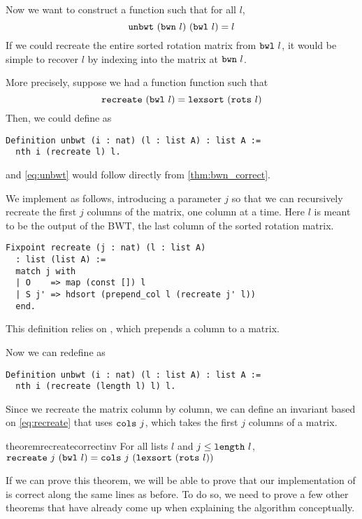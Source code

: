 \documentclass[sigplan,10pt,anonymous,review]{thesis}
\begin{document}
Now we want to construct a function  such that for all $l$,
\begin{equation}
  \texttt{\textup{unbwt}}~(\texttt{\textup{bwn}}~l)~(\texttt{\textup{bwl}}~l) = l
  \label{eq:unbwt}
\end{equation}
If we could recreate the entire sorted rotation matrix from
$\texttt{\textup{bwl}}~l$, it would be simple to recover $l$ by indexing into
the matrix at $\texttt{\textup{bwn}}~l$.

More precisely, suppose we had a function function 
such that
\begin{equation}
  \label{eq:recreate}
  \texttt{\textup{recreate}}~(\texttt{\textup{bwl}}~l) = \texttt{\textup{lexsort}}~(\texttt{\textup{rots}}~l)
\end{equation}
Then, we could define  as
\begin{lstlisting}
Definition unbwt (i : nat) (l : list A) : list A :=
  nth i (recreate l) l.
\end{lstlisting}
and \cref{eq:unbwt} would follow directly from \cref{thm:bwn_correct}.

We implement  as follows, introducing a parameter $j$ so
that we can recursively recreate the first $j$ columns of the matrix,
one column at a time. Here $l$ is meant to be the output of the BWT,
the last column of the sorted rotation matrix.
\begin{lstlisting}
Fixpoint recreate (j : nat) (l : list A)
  : list (list A) :=
  match j with
  | O    => map (const []) l
  | S j' => hdsort (prepend_col l (recreate j' l))
  end.
\end{lstlisting}
This definition relies on , which prepends a column
to a matrix.

Now we can redefine  as
\begin{lstlisting}
Definition unbwt (i : nat) (l : list A) : list A :=
  nth i (recreate (length l) l) l.
\end{lstlisting}

Since we recreate the matrix column by column, we can define an
invariant based on \cref{eq:recreate} that uses $\texttt{\textup{cols}}~j$, which
takes the first $j$ columns of a matrix.
\begin{restatable*}{theorem}{recreatecorrectinv}
  For all lists $l$ and $j \le \texttt{\textup{length}}~l$,
  $\texttt{\textup{recreate}}~j~(\texttt{\textup{bwl}}~l) =
  \texttt{\textup{cols}}~j~(\texttt{\textup{lexsort}}~(\texttt{\textup{rots}}~l))$
\end{restatable*}

If we can prove this theorem, we will be able to prove that our
implementation of  is correct along the same lines as
before. To do so, we need to prove a few other theorems that
have already come up when explaining the algorithm conceptually.
\end{document}
